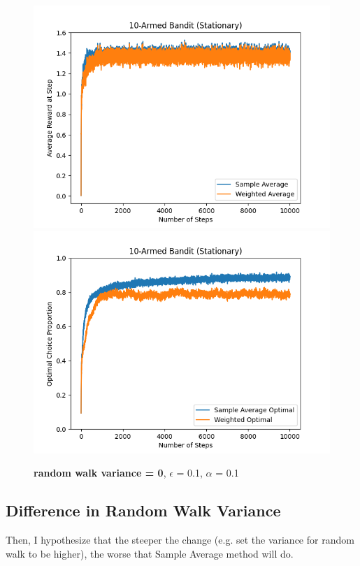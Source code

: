 \documentclass{article}
\begin{document}
\begin{figure}[h!]
\centering
\includegraphics[scale=.6]{RL_A1_pics/mean0var1randomMeans.png}
\includegraphics[scale=.6]{RL_A1_pics/mean0var1randomMeans_optimal.png}
\caption{\textbf{random walk variance = 0}, $\epsilon$ = 0.1, $\alpha$ = 0.1}
\label{fig:10-Armed1}
\end{figure}


\subsection{Difference in Random Walk Variance}
Then, I hypothesize that the steeper the change (e.g. set the variance for random walk to be higher), the worse that Sample Average method will do.
\end{document}
